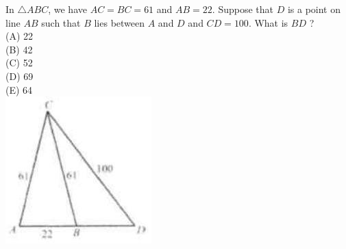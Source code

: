 \documentclass{article}
\begin{document}
In \(\triangle A B C\), we have \(A C=B C=61\) and \(A B=22\). Suppose that \(D\) is a point on line \(A B\) such that \(B\) lies between \(A\) and \(D\) and \(C D=100\). What is \(B D\) ?\\
(A) 22\\
(B) 42\\
(C) 52\\
(D) 69\\
(E) 64\\
\centering
\includegraphics[width=\textwidth]{images/080.jpg}
\end{document}
